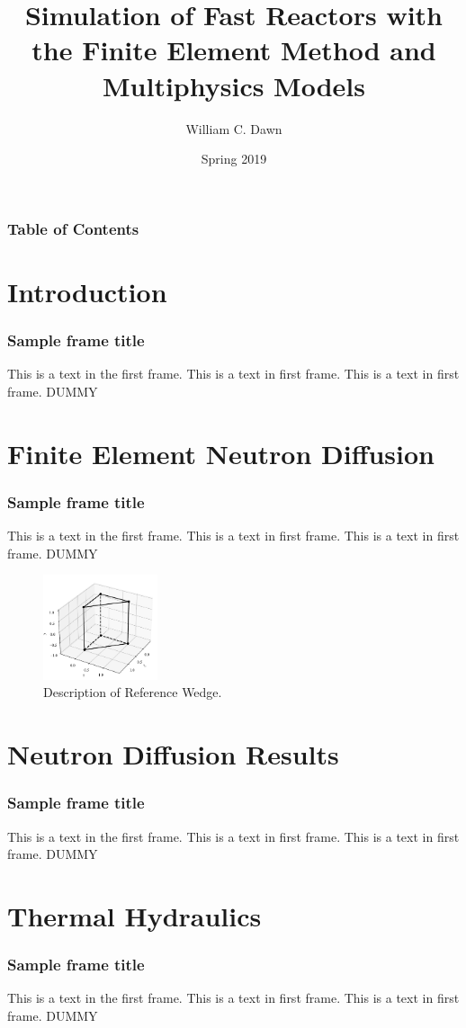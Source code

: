 \documentclass[professionalfont]{beamer}
\title{Simulation of Fast Reactors with the Finite Element Method and
Multiphysics Models}
\author{William C. Dawn}
\institute{North Carolina State University}
\date{Spring 2019}
\begin{document}
\begin{frame}
  \titlepage
\end{frame}

\begin{frame}
  \frametitle{Table of Contents}
  \tableofcontents
\end{frame}

\section{Introduction}
  \begin{frame}
    \frametitle{Sample frame title}
    This is a text in the first frame. This is a text in first frame. This is a
    text in first frame. DUMMY
  \end{frame}

\section{Finite Element Neutron Diffusion}
  \begin{frame}
    \frametitle{Sample frame title}
    This is a text in the first frame. This is a text in first frame. This is a
    text in first frame. DUMMY
    \begin{figure}
      \centering
      \includegraphics[width=0.3\textwidth]{Wref}
      \caption{Description of Reference Wedge.}
      \label{fig:Wref}
    \end{figure}
  \end{frame}

\section{Neutron Diffusion Results}
  \begin{frame}
    \frametitle{Sample frame title}
    This is a text in the first frame. This is a text in first frame. This is a
    text in first frame. DUMMY
  \end{frame}

\section{Thermal Hydraulics}
  \begin{frame}
    \frametitle{Sample frame title}
    This is a text in the first frame. This is a text in first frame. This is a
    text in first frame. DUMMY
  \end{frame}
\end{document}
